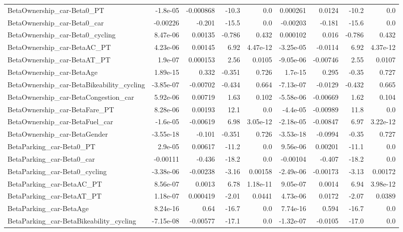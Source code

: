 \begin{tabular}{lrrrrrrrr}
BetaOwnership_car-Beta0_PT & -1.8e-05 & -0.000868 & -10.3 & 0.0 & 0.000261 & 0.0124 & -10.2 & 0.0 \\
BetaOwnership_car-Beta0_car & -0.00226 & -0.201 & -15.5 & 0.0 & -0.00203 & -0.181 & -15.6 & 0.0 \\
BetaOwnership_car-Beta0_cycling & 8.47e-06 & 0.00135 & -0.786 & 0.432 & 0.000102 & 0.016 & -0.786 & 0.432 \\
BetaOwnership_car-BetaAC_PT & 4.23e-06 & 0.00145 & 6.92 & 4.47e-12 & -3.25e-05 & -0.0114 & 6.92 & 4.37e-12 \\
BetaOwnership_car-BetaAT_PT & 1.9e-07 & 0.000153 & 2.56 & 0.0105 & -9.05e-06 & -0.00746 & 2.55 & 0.0107 \\
BetaOwnership_car-BetaAge & 1.89e-15 & 0.332 & -0.351 & 0.726 & 1.7e-15 & 0.295 & -0.35 & 0.727 \\
BetaOwnership_car-BetaBikeability_cycling & -3.85e-07 & -0.00702 & -0.434 & 0.664 & -7.13e-07 & -0.0129 & -0.432 & 0.665 \\
BetaOwnership_car-BetaCongestion_car & 5.92e-06 & 0.00719 & 1.63 & 0.102 & -5.58e-06 & -0.00669 & 1.62 & 0.104 \\
BetaOwnership_car-BetaFare_PT & 8.28e-06 & 0.00193 & 12.1 & 0.0 & -4.4e-05 & -0.00989 & 11.8 & 0.0 \\
BetaOwnership_car-BetaFuel_car & -1.6e-05 & -0.00619 & 6.98 & 3.05e-12 & -2.18e-05 & -0.00847 & 6.97 & 3.22e-12 \\
BetaOwnership_car-BetaGender & -3.55e-18 & -0.101 & -0.351 & 0.726 & -3.53e-18 & -0.0994 & -0.35 & 0.727 \\
BetaParking_car-Beta0_PT & 2.9e-05 & 0.00617 & -11.2 & 0.0 & 9.56e-06 & 0.00201 & -11.1 & 0.0 \\
BetaParking_car-Beta0_car & -0.00111 & -0.436 & -18.2 & 0.0 & -0.00104 & -0.407 & -18.2 & 0.0 \\
BetaParking_car-Beta0_cycling & -3.38e-06 & -0.00238 & -3.16 & 0.00158 & -2.49e-06 & -0.00173 & -3.13 & 0.00172 \\
BetaParking_car-BetaAC_PT & 8.56e-07 & 0.0013 & 6.78 & 1.18e-11 & 9.05e-07 & 0.0014 & 6.94 & 3.98e-12 \\
BetaParking_car-BetaAT_PT & 1.18e-07 & 0.000419 & -2.01 & 0.0441 & 4.73e-06 & 0.0172 & -2.07 & 0.0389 \\
BetaParking_car-BetaAge & 8.24e-16 & 0.64 & -16.7 & 0.0 & 7.74e-16 & 0.594 & -16.7 & 0.0 \\
BetaParking_car-BetaBikeability_cycling & -7.15e-08 & -0.00577 & -17.1 & 0.0 & -1.32e-07 & -0.0105 & -17.0 & 0.0 \\

\end{tabular}
